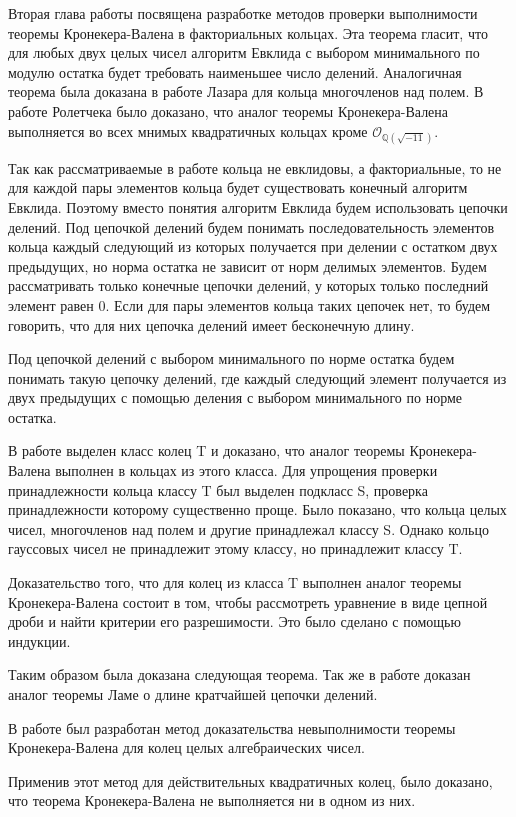 \documentclass[12pt]{article}
\begin{document}
Вторая глава работы посвящена разработке методов проверки выполнимости теоремы Кронекера-Валена в факториальных кольцах.
Эта теорема гласит, что для любых двух целых чисел алгоритм Евклида с выбором минимального по модулю остатка будет требовать наименьшее число делений.
Аналогичная теорема была доказана в работе Лазара для кольца многочленов над полем.
В работе Ролетчека было доказано, что аналог теоремы Кронекера-Валена выполняется во всех мнимых квадратичных кольцах кроме $\mathcal{O}_{\mathbb{Q}(\sqrt{-11})}$.
    
Так как рассматриваемые в работе кольца не евклидовы, а факториальные, то не для каждой пары элементов кольца будет существовать конечный алгоритм Евклида.
Поэтому вместо понятия алгоритм Евклида будем использовать цепочки делений.
Под цепочкой делений будем понимать последовательность элементов кольца каждый следующий из которых получается при делении с остатком двух предыдущих, но норма остатка не зависит от норм делимых элементов.
Будем рассматривать только конечные цепочки делений, у которых только последний элемент равен $0$.
Если для пары элементов кольца таких цепочек нет, то будем говорить, что для них цепочка делений имеет бесконечную длину.
    
Под цепочкой делений с выбором минимального по норме остатка будем понимать такую цепочку делений, где каждый следующий элемент получается из двух предыдущих с помощью деления с выбором минимального по норме остатка.

В работе выделен класс колец T и доказано, что аналог теоремы Кронекера-Валена выполнен в кольцах из этого класса.
Для упрощения проверки принадлежности кольца классу T был выделен подкласс S, проверка принадлежности которому существенно проще.
Было показано, что кольца целых чисел, многочленов над полем и другие принадлежал классу S.
Однако кольцо гауссовых чисел не принадлежит этому классу, но принадлежит классу T.

Доказательство того, что для колец из класса T выполнен аналог теоремы Кронекера-Валена состоит в том, чтобы рассмотреть уравнение в виде цепной дроби и найти критерии его разрешимости.
Это было сделано с помощью индукции.

Таким образом была доказана следующая теорема.
Так же в работе доказан аналог теоремы Ламе о длине кратчайшей цепочки делений.

В работе был разработан метод доказательства невыполнимости теоремы Кронекера-Валена для колец целых алгебраических чисел.

Применив этот метод для действительных квадратичных колец, было доказано, что теорема Кронекера-Валена не выполняется ни в одном из них.
\end{document}
